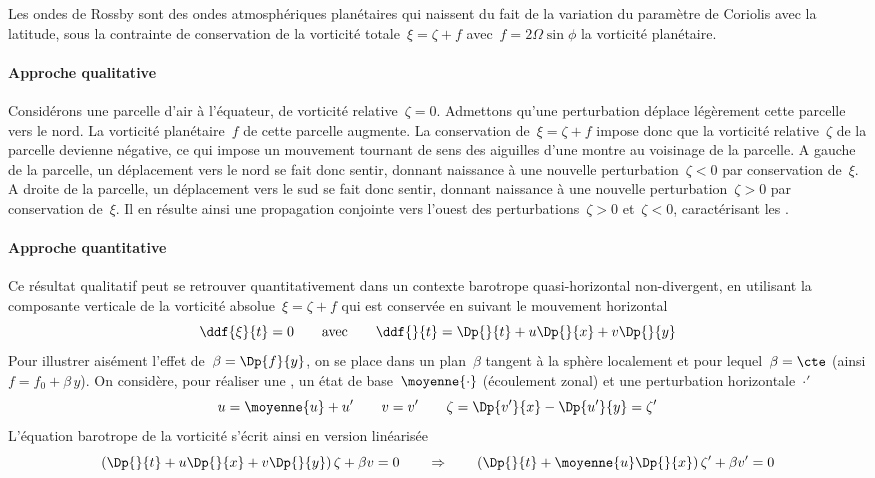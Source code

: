 \sk
Les ondes de Rossby sont des ondes atmosphériques planétaires qui
naissent du fait de la variation du paramètre de Coriolis avec la latitude,
sous la contrainte de conservation de la vorticité totale~$\xi = \zeta + f$
avec~$f=2\Omega\sin\phi$ la vorticité planétaire.

\sk
\paragraph{Approche qualitative} Considérons une parcelle d'air à l'équateur, de vorticité relative~$\zeta = 0$.
Admettons qu'une perturbation déplace légèrement cette parcelle vers le nord.
La vorticité planétaire~$f$ de cette parcelle augmente.
La conservation de~$\xi = \zeta + f$ impose donc
que la vorticité relative~$\zeta$ de la parcelle devienne négative,
ce qui impose un mouvement tournant de sens des aiguilles d'une montre
au voisinage de la parcelle.
A gauche de la parcelle, un déplacement vers le nord se fait
donc sentir, donnant naissance à une nouvelle perturbation~$\zeta < 0$ par conservation de~$\xi$.
A droite de la parcelle, un déplacement vers le sud se fait
donc sentir, donnant naissance à une nouvelle perturbation~$\zeta > 0$ par conservation de~$\xi$.
Il en résulte ainsi une propagation conjointe vers l'ouest 
des perturbations~$\zeta > 0$ et~$\zeta < 0$,
caractérisant les .

\sk
\paragraph{Approche quantitative}
Ce résultat qualitatif peut se retrouver quantitativement
dans un contexte barotrope quasi-horizontal non-divergent,
en utilisant la composante verticale de la vorticité absolue~$\xi = \zeta + f$
qui est conservée en suivant le mouvement horizontal
\[ 
\ddf{\xi}{t} = 0 
\qquad
\textrm{avec}
\qquad
\ddf{}{t} = \Dp{}{t} + u \Dp{}{x} + v \Dp{}{y}
\]
Pour illustrer aisément l'effet de~$\beta = \Dp{f}{y}$,
on se place dans un plan~$\beta$ tangent à la sphère localement
et pour lequel~$\beta = \cte$ (ainsi $f = f_0 + \beta\,y$).
On considère, pour réaliser une ,
un état de base~$\moyenne{\cdot}$ (écoulement zonal)
et une perturbation horizontale~$\cdot'$
\[
u = \moyenne{u} + u' 
\qquad 
v = v' 
\qquad 
\zeta = \Dp{v'}{x} - \Dp{u'}{y} = \zeta'
\]
\noindent L'équation barotrope de la vorticité s'écrit ainsi en version linéarisée
\[ 
\left( \Dp{}{t} + u \Dp{}{x} + v \Dp{}{y} \right) \zeta + \beta v = 0
\qquad
\Rightarrow
\qquad
\left( \Dp{}{t} + \moyenne{u} \Dp{}{x} \right) \zeta' + \beta v' = 0
\]

